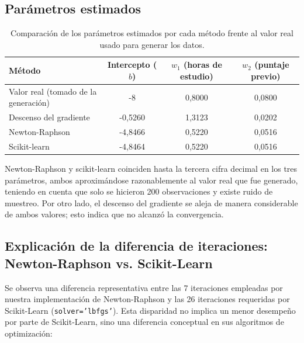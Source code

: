\subsection{Parámetros estimados}
\begin{table}[H]
\centering
\begin{tabular}{|l|c|c|c|}
\hline
\textbf{Método} & \textbf{Intercepto ($b$)} & \textbf{$w_1$ (horas de estudio)} & \textbf{$w_2$ (puntaje previo)} \\
\hline
Valor real (tomado de la generación) & -8 & 0,8000 & 0,0800 \\
Descenso del gradiente & -0,5260 & 1,3123 & 0,0202 \\
Newton-Raphson & -4,8466 & 0,5220 & 0,0516 \\
Scikit-learn & -4,8464 & 0,5220 & 0,0516 \\
\hline
\end{tabular}
\caption{Comparación de los parámetros estimados por cada método frente al valor real usado para generar los datos.}
\end{table}
Newton-Raphson y scikit-learn coinciden hasta la tercera cifra decimal en los tres parámetros, ambos aproximándose razonablemente al valor real que fue generado, teniendo en cuenta que solo se hicieron 200 observaciones y existe ruido de muestreo. Por otro lado, el descenso del gradiente se aleja de manera considerable de ambos valores; esto indica que no alcanzó la convergencia.
\subsection{Explicación de la diferencia de iteraciones: Newton-Raphson vs. Scikit-Learn}
Se observa una diferencia representativa entre las 7 iteraciones empleadas por nuestra implementación de Newton-Raphson y las 26 iteraciones requeridas por Scikit-Learn (\texttt{solver='lbfgs'}). Esta disparidad no implica un menor desempeño por parte de Scikit-Learn, sino una diferencia conceptual en sus algoritmos de optimización:

